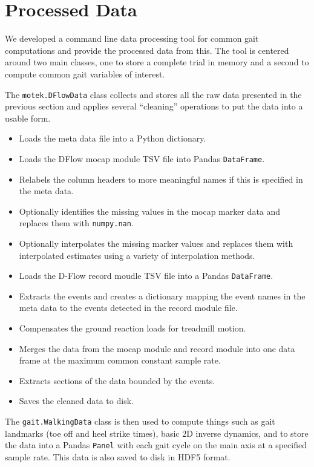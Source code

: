 \documentclass{article}
\begin{document}
\section{Processed Data}

We developed a command line data processing tool for common gait computations
and provide the processed data from this. The tool is centered around two main
classes, one to store a complete trial in memory and a second to compute common
gait variables of interest.

The \verb|motek.DFlowData| class collects and stores all the raw data presented
in the previous section and applies several ``cleaning'' operations to put the
data into a usable form.

\begin{itemize}
  \item Loads the meta data file into a Python dictionary.
  \item Loads the DFlow mocap module TSV file into Pandas \verb|DataFrame|.
  \item Relabels the column headers to more meaningful names if this is
    specified in the meta data.
  \item Optionally identifies the missing values in the mocap marker data and
    replaces them with \verb|numpy.nan|.
  \item Optionally interpolates the missing marker values and replaces them
    with interpolated estimates using a variety of interpolation methods.
  \item Loads the D-Flow record moudle TSV file into a Pandas \verb|DataFrame|.
  \item Extracts the events and creates a dictionary mapping the event names in
    the meta data to the events detected in the record module file.
  \item Compensates the ground reaction loads for treadmill motion.
  \item Merges the data from the mocap module and record module into one data
    frame at the maximum common constant sample rate.
  \item Extracts sections of the data bounded by the events.
  \item Saves the cleaned data to disk.
\end{itemize}

The \verb|gait.WalkingData| class is then used to compute things such as gait
landmarks (toe off and heel strike times), basic 2D inverse dynamics, and to
store the data into a Pandas \verb|Panel| with each gait cycle on the main axis
at a specified sample rate. This data is also saved to disk in HDF5 format.
\end{document}
